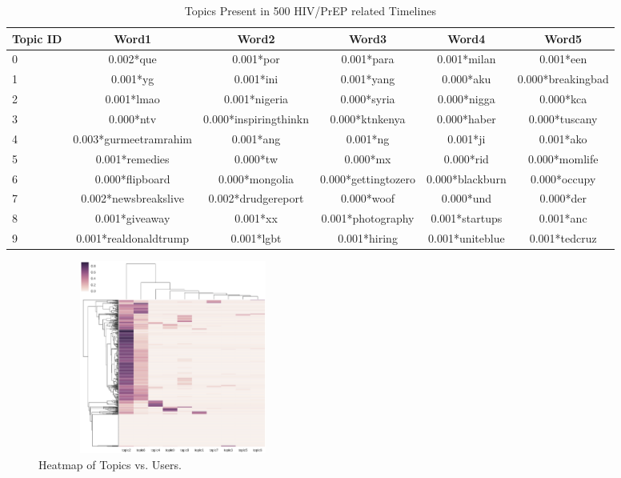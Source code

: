 \documentclass{sig-alternate-05-2015}
\begin{document}
\begin{table}
\centering
\caption{Topics Present in 500 HIV/PrEP related Timelines}
\begin{tabular}{|l|c|c|c|c|c|} \hline
Topic ID & Word1 & Word2 & Word3 & Word4 & Word5\\ \hline
0 & 0.002*que & 0.001*por & 0.001*para & 0.001*milan & 0.001*een\\ \hline
1 & 0.001*yg & 0.001*ini & 0.001*yang & 0.000*aku & 0.000*breakingbad\\ \hline
2 & 0.001*lmao & 0.001*nigeria & 0.000*syria & 0.000*nigga & 0.000*kca\\ \hline
3 & 0.000*ntv & 0.000*inspiringthinkn & 0.000*ktnkenya & 0.000*haber & 0.000*tuscany\\ \hline
4 & 0.003*gurmeetramrahim & 0.001*ang & 0.001*ng & 0.001*ji & 0.001*ako\\ \hline
5 & 0.001*remedies & 0.000*tw & 0.000*mx & 0.000*rid & 0.000*momlife\\ \hline
6 & 0.000*flipboard & 0.000*mongolia & 0.000*gettingtozero & 0.000*blackburn & 0.000*occupy\\ \hline
7 & 0.002*newsbreakslive & 0.002*drudgereport & 0.000*woof & 0.000*und & 0.000*der\\ \hline
8 & 0.001*giveaway & 0.001*xx & 0.001*photography & 0.001*startups & 0.001*anc\\ \hline
9 & 0.001*realdonaldtrump & 0.001*lgbt & 0.001*hiring & 0.001*uniteblue & 0.001*tedcruz\\ \hline
\hline\end{tabular}
\end{table}

\begin{figure}
\centering
\includegraphics[height=2.5in, width=3.5in]{user_time}
\caption{Heatmap of Topics vs. Users.}
\end{figure}
\end{document}
